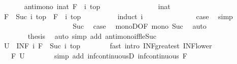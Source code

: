 \begin{isabellebody}
\ \ \ \ \isamarkupfalse%
\ {\isacharasterisk}{\isacharcolon}\ {\isachardoublequoteopen}antimono\ {\isacharparenleft}{\isasymlambda}i{\isacharcolon}{\isacharcolon}nat{\isachardot}\ {\isacharparenleft}F\ {\isacharcircum}{\isacharcircum}\ i{\isacharparenright}\ top{\isacharparenright}{\isachardoublequoteclose}\isanewline
\ \ \ \ \isamarkupfalse%
\ {\isacharminus}\isanewline
\ \ \ \ \ \ \isacommand{{\isacharbraceleft}}\isamarkupfalse%
\ \isamarkupfalse%
\ i{\isacharcolon}{\isacharcolon}nat\ \isamarkupfalse%
\ {\isachardoublequoteopen}{\isacharparenleft}F\ {\isacharcircum}{\isacharcircum}\ Suc\ i{\isacharparenright}\ top\ {\isasymle}\ {\isacharparenleft}F\ {\isacharcircum}{\isacharcircum}\ i{\isacharparenright}\ top{\isachardoublequoteclose}\isanewline
\ \ \ \ \ \ \ \ \isamarkupfalse%
\ {\isacharparenleft}induct\ i{\isacharparenright}\isanewline
\ \ \ \ \ \ \ \ \ \ \isamarkupfalse%
\ {}\ \isamarkupfalse%
\ {\isacharquery}case\ \isamarkupfalse%
\ simp\isanewline
\ \ \ \ \ \ \ \ \isamarkupfalse%
\isanewline
\ \ \ \ \ \ \ \ \ \ \isamarkupfalse%
\ Suc\ \isamarkupfalse%
\ {\isacharquery}case\ \isamarkupfalse%
\ monoD{\isacharbrackleft}OF\ mono\ Suc{\isacharbrackright}\ \isamarkupfalse%
\ auto\isanewline
\ \ \ \ \ \ \ \ \isamarkupfalse%
\ \isacommand{{\isacharbraceright}}\isamarkupfalse%
\isanewline
\ \ \ \ \ \ \isamarkupfalse%
\ {\isacharquery}thesis\ \isamarkupfalse%
\ {\isacharparenleft}auto\ simp\ add{\isacharcolon}\ antimono{\isacharunderscore}iff{\isacharunderscore}le{\isacharunderscore}Suc{\isacharparenright}\isanewline
\ \ \ \ \isamarkupfalse%
\isanewline
\ \ \ \ \isamarkupfalse%
\ {\isachardoublequoteopen}{\isacharquery}U\ {\isasymle}\ {\isacharparenleft}INF\ i{\isachardot}\ {\isacharparenleft}F\ {\isacharcircum}{\isacharcircum}\ Suc\ i{\isacharparenright}\ top{\isacharparenright}{\isachardoublequoteclose}\isanewline
\ \ \ \ \ \ \isamarkupfalse%
\ {\isacharparenleft}fast\ intro{\isacharcolon}\ INF{\isacharunderscore}greatest\ INF{\isacharunderscore}lower{\isacharparenright}\isanewline
\ \ \ \ \isamarkupfalse%
\ \isamarkupfalse%
\ {\isachardoublequoteopen}{\isasymdots}\ {\isasymle}\ F\ {\isacharquery}U{\isachardoublequoteclose}\isanewline
\ \ \ \ \ \ \isamarkupfalse%
\ {\isacharparenleft}simp\ add{\isacharcolon}\ inf{\isacharunderscore}continuousD\ {\isacartoucheopen}inf{\isacharunderscore}continuous\ F{\isacartoucheclose}\ {\isacharasterisk}{\isacharparenright}\isanewline

\end{isabellebody}
